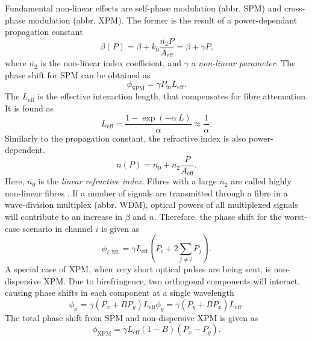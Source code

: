 \documentclass{standalone}
\begin{document}
Fundamental non-linear effects are self-phase modulation (abbr. SPM) and cross-phase modulation (abbr. XPM). The former is the result of a power-dependant propagation constant
\begin{equation}
\beta(P) = \beta + k_0 \frac{\overline{n_2} P}{A_\textrm{eff}} = \beta + \gamma P \textrm{,}
\end{equation}
where $\overline{n_2}$ is the non-linear index coefficient, and $\gamma$ a \textit{non-linear parameter}. The phase shift for SPM can be obtained as
\begin{equation}
\phi_\textrm{SPM} = \gamma P_\textrm{in} L_\textrm{eff} \textrm{.}
\end{equation}
The $L_\textrm{eff}$ is the effective interaction length, that compensates for fibre attenuation. It is found as
\begin{equation} \label{eq:leff}
L_\textrm{eff} = \frac{1 - \exp\left(-\alpha \, L\right)}{\alpha} \approx \frac{1}{\alpha} \textrm{.}
\end{equation}
Similarly to the propagation constant, the refractive index is also power-dependent.
\begin{equation}
n(P) = \overline{n_0} + \overline{n_2} \frac{P}{A_\textrm{eff}} \textrm{.}
\end{equation}
Here, $\overline{n_0}$ is the \textit{linear refractive index}. Fibres with a large $\overline{n_2}$ are called highly non-linear fibres \cite{Hiroishi2003}. If a number of signals are transmitted through a fibre in a wave-division multiplex (abbr. WDM), optical powers of all multiplexed signals will contribute to an increase in $\beta$ and $n$. Therefore, the phase shift for the worst-case scenario in channel $i$ is given as
\begin{equation}
\phi_{i,\textrm{NL}} = \gamma L_\textrm{eff} \left( P_i + 2 \sum_{j\ne i} P_j \right) \textrm{.}
\end{equation}
A special case of XPM, when very short optical pulses are being sent, is non-dispersive XPM. Due to birefringence, two orthogonal components will interact, causing phase shifts in each component at a single wavelength
\begin{subequations}
	\begin{equation}
	\phi_x = \gamma \left(P_x + B P_y\right) L_\textrm{eff}
	\end{equation}
	\begin{equation}
	\phi_y = \gamma \left( P_y + B P_x \right) L_\textrm{eff} \textrm{.}
	\end{equation} 
\end{subequations}
The total phase shift from SPM and non-dispersive XPM is given as
\begin{equation}
\phi_\textrm{XPM} = \gamma L_\textrm{eff} \left(1 - B\right) \left(P_x - P_y\right) \textrm{.}
\end{equation} \\
\end{document}
